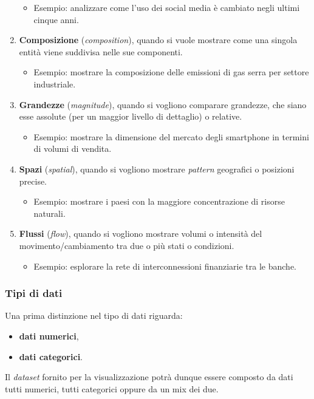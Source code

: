 \begin{enumerate}
    \begin{itemize}
        \item Esempio: analizzare come l'uso dei social media è cambiato negli ultimi cinque anni.
    \end{itemize}
    \item \textbf{Composizione} (\emph{composition}), quando si vuole mostrare come una singola entità viene suddivisa nelle sue componenti.
    \begin{itemize}
        \item Esempio: mostrare la composizione delle emissioni di gas serra per settore industriale.
    \end{itemize}
    \item \textbf{Grandezze} (\emph{magnitude}), quando si vogliono comparare grandezze, che siano esse assolute (per un maggior livello di dettaglio) o relative. 
    \begin{itemize}
        \item Esempio: mostrare la dimensione del mercato degli smartphone in termini di volumi di vendita.
    \end{itemize}
    \item \textbf{Spazi} (\emph{spatial}), quando si vogliono mostrare \emph{pattern} geografici o posizioni precise.
    \begin{itemize}
        \item Esempio: mostrare i paesi con la maggiore concentrazione di risorse naturali.
    \end{itemize}
    \item \textbf{Flussi} (\emph{flow}), quando si vogliono mostrare volumi o intensità del movimento/cambiamento tra due o più stati o condizioni.
    \begin{itemize}
        \item Esempio: esplorare la rete di interconnessioni finanziarie tra le banche.
    \end{itemize}
\end{enumerate}

\subsubsection{Tipi di dati}
Una prima distinzione nel tipo di dati riguarda:
\begin{itemize}
    \item \textbf{dati numerici},
    \item \textbf{dati categorici}.
\end{itemize}
Il \emph{dataset} fornito per la visualizzazione potrà dunque essere composto da dati tutti numerici, tutti categorici oppure da un mix dei due.

